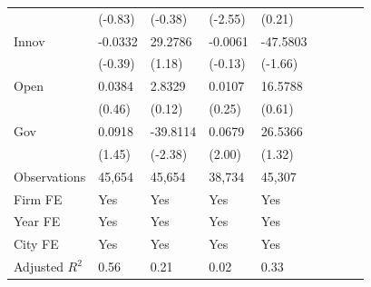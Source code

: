 \begin{table}[htbp]
\begin{tabularx}{\textwidth}{lYYYYYYYY@{}}
                &  (-0.83)         &  (-0.38)         &  (-2.55)         &   (0.21)         \\
Innov           &  -0.0332         &  29.2786         &  -0.0061         & -47.5803\sym{*}  \\
                &  (-0.39)         &   (1.18)         &  (-0.13)         &  (-1.66)         \\
Open            &   0.0384         &   2.8329         &   0.0107         &  16.5788         \\
                &   (0.46)         &   (0.12)         &   (0.25)         &   (0.61)         \\
Gov             &   0.0918         & -39.8114\sym{**} &   0.0679\sym{**} &  26.5366         \\
                &   (1.45)         &  (-2.38)         &   (2.00)         &   (1.32)         \\
\hline
Observations    &   45,654         &   45,654         &   38,734         &   45,307         \\
Firm FE         &      Yes         &      Yes         &      Yes         &      Yes         \\
Year FE         &      Yes         &      Yes         &      Yes         &      Yes         \\
City FE         &      Yes         &      Yes         &      Yes         &      Yes         \\
Adjusted $ R^2$ &     0.56         &     0.21         &     0.02         &     0.33         \\
\bottomrule
\end{tabularx}
\end{table}
